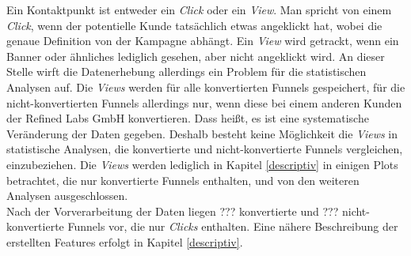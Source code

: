 Ein Kontaktpunkt ist entweder ein \textit{Click} oder ein \textit{View}. Man spricht von einem \textit{Click}, wenn der potentielle Kunde tatsächlich etwas angeklickt hat, wobei die genaue Definition von der Kampagne abhängt. Ein \textit{View} wird getrackt, wenn ein Banner oder ähnliches lediglich gesehen, aber nicht angeklickt wird. An dieser Stelle wirft die Datenerhebung allerdings ein Problem für die statistischen Analysen auf. Die \textit{Views} werden für alle konvertierten Funnels gespeichert, für die nicht-konvertierten Funnels allerdings nur, wenn diese bei einem anderen Kunden der Refined Labs GmbH konvertieren. Dass heißt, es ist eine systematische Veränderung der Daten gegeben. Deshalb besteht keine Möglichkeit die \textit{Views} in statistische Analysen, die konvertierte und nicht-konvertierte Funnels vergleichen, einzubeziehen. Die \textit{Views} werden lediglich in Kapitel \ref{descriptiv} in einigen Plots betrachtet, die nur konvertierte Funnels enthalten, und von den weiteren Analysen ausgeschlossen.\\
Nach der Vorverarbeitung der Daten liegen ??? konvertierte und ??? nicht-konvertierte Funnels vor, die nur \textit{Clicks} enthalten. Eine nähere Beschreibung der erstellten Features erfolgt in Kapitel \ref{descriptiv}.



